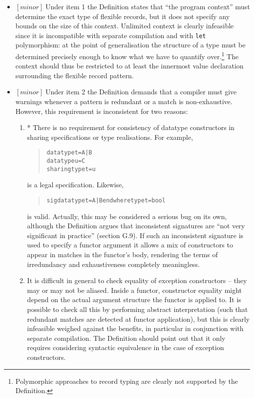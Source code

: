 \documentclass{article}
\newcommand{\m}[1]{$[\mathit{#1}]\;$}
\newcommand{\minor}{\m{minor}}
\begin{document}
\begin{itemize}
\item \minor Under item 1 the Definition states that ``the program context'' must determine the exact type of flexible records, but it does not specify any bounds on the size of this context. Unlimited context is clearly infeasible since it is incompatible with separate compilation and with {\tt let} polymorphism: at the point of generalisation the structure of a type must be determined precisely enough to know what we have to quantify over.\footnote{Polymorphic approaches to record typing are clearly not supported by the Definition.} The context should thus be restricted to at least the innermost value declaration surrounding the flexible record pattern.

\item \minor Under item 2 the Definition demands that a compiler must give warnings whenever a pattern is redundant or a match is non-exhaustive. However, this requirement is inconsistent for two reasons:

\begin{enumerate}
\item * There is no requirement for consistency of datatype constructors in sharing specifications or type realisations. For example,
\begin{quote}
\begin{alltt}
datatype t = A | B
datatype u = C
sharing type t = u
\end{alltt}
\end{quote}
is a legal specification. Likewise,
\begin{quote}
\begin{alltt}
sig datatype t = A | B end where type t = bool
\end{alltt}
\end{quote}
is valid. Actually, this may be considered a serious bug on its own, although the Definition argues that inconsistent signatures are ``not very significant in practice'' (section G.9). If such an inconsistent signature is used to specify a functor argument it allows a mix of constructors to appear in matches in the functor's body, rendering the terms of irredundancy and exhaustiveness completely meaningless.

\item It is difficult in general to check equality of exception constructors -- they may or may not be aliased. Inside a functor, constructor equality might depend on the actual argument structure the functor is applied to. It is possible to check all this by performing abstract interpretation (such that redundant matches are detected at functor application), but this is clearly infeasible weighed against the benefits, in particular in conjunction with separate compilation. The Definition should point out that it only requires considering syntactic equivalence in the case of exception constructors.
\end{enumerate}
\end{itemize}
\end{document}
